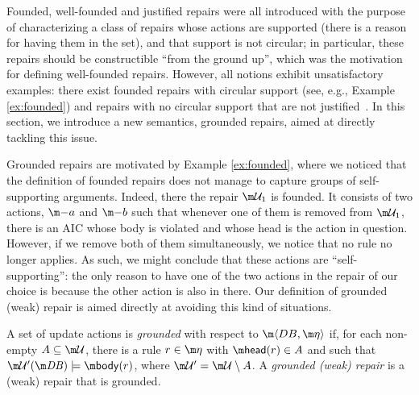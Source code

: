 Founded, well-founded and justified repairs were all introduced with the purpose of characterizing a class of repairs whose actions are supported (there is a reason for having them in the set), and that support is not circular; in particular, these repairs should be constructible ``from the ground up'', which was the motivation for defining well-founded repairs.
However, all notions exhibit unsatisfactory examples: there exist founded repairs with circular support (see, e.g., Example \ref{ex:founded}) and repairs with no circular support that are not justified~\cite{CEGN13}. %
In this section, we introduce a new semantics, grounded repairs, aimed at directly tackling this issue. 

Grounded repairs are motivated by Example \ref{ex:founded}, where we noticed that the definition of founded repairs does not manage to capture groups of self-supporting arguments. 
Indeed, there the repair $\UU_1$ is founded. It consists of two actions, $\remove a$ and $\remove b$ such that whenever one of them is removed from $\UU_1$, there is an AIC whose body is violated and whose head is the action in question. 
However, if we remove both of them simultaneously, we notice that no rule no longer applies. As such, we might conclude that these actions are ``self-supporting'': the only reason to have one of the two actions in the repair of our choice is because the other action is also in there. 
Our definition of grounded (weak) repair is aimed directly at avoiding this kind of situations. 

\begin{definition}\label{def:grounded}
 A set of update actions \UU is \emph{grounded} with respect to $\fulldb$ if, for each non-empty $A \subseteq  \UU$, there is a rule  $r\in \aics$ with $\head(r)\in A$ and such that $\UU'(\db)\models \body(r)$, where $\UU'=\UU\setminus A$. A \emph{grounded (weak) repair} is a (weak) repair that is grounded.
 \end{definition}
  
